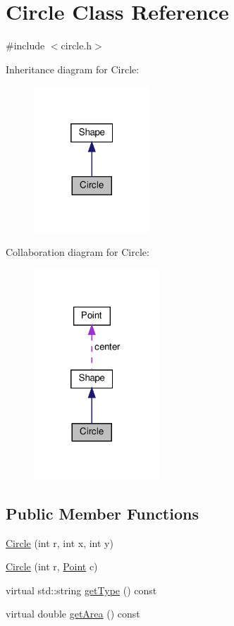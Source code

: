 \hypertarget{class_circle}{}\section{Circle Class Reference}
\label{class_circle}


{\ttfamily \#include $<$circle.\+h$>$}



Inheritance diagram for Circle\+:
\nopagebreak
\begin{figure}[H]
\begin{center}
\leavevmode
\includegraphics[width=124pt]{class_circle__inherit__graph}
\end{center}
\end{figure}


Collaboration diagram for Circle\+:
\nopagebreak
\begin{figure}[H]
\begin{center}
\leavevmode
\includegraphics[width=133pt]{class_circle__coll__graph}
\end{center}
\end{figure}
\subsection*{Public Member Functions}
\begin{DoxyCompactItemize}
\item 
\hyperlink{class_circle_aae9c477673e3d2b567708445ab0bf37b}{Circle} (int r, int x, int y)
\item 
\hyperlink{class_circle_a8aa6804985da2da8a802d790f1938ce0}{Circle} (int r, \hyperlink{class_point}{Point} c)
\item 
virtual std\+::string \hyperlink{class_circle_aa65920b2299c79c2374ddca532337a93}{get\+Type} () const 
\item 
virtual double \hyperlink{class_circle_a776294d621eaf1bb3d42295037b05ec5}{get\+Area} () const 
\end{DoxyCompactItemize}
